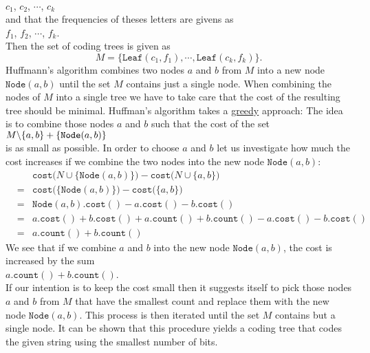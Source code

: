 \\[0.2cm]
\hspace*{1.3cm}
$c_1$, $c_2$, $\cdots$, $c_k$
\\[0.2cm]
and that the frequencies of theses letters are givens as
\\[0.2cm]
\hspace*{1.3cm}
$f_1$, $f_2$, $\cdots$, $f_k$.
\\[0.2cm]
Then the set of coding trees is given as
\begin{equation}
  \label{eq:huffmann1}
 M = \bigl\{  \texttt{Leaf}(c_1, f_1), \cdots, \texttt{Leaf}(c_k, f_k) \bigr\}.   
\end{equation}
Huffmann's algorithm combines two nodes $a$ and $b$ from $M$ into a new node
$\texttt{Node}(a,b)$ until the set $M$ contains just a single node.  When combining the nodes of $M$ into a single
tree we have to take care that the cost of the resulting tree should be minimal.
Huffman's algorithm takes a \href{https://en.wikipedia.org/wiki/Greedy_algorithm}{greedy} approach: 
The idea is to combine those nodes $a$ and $b$ such that the cost of the set
\\[0.2cm]
\hspace*{1.3cm}
$M \symbol{92} \{a,b\} + \{ \texttt{Node}(a,b) \}$
\\[0.2cm]
is as small as possible.
In order to choose $a$ and $b$ let us investigate how much the cost increases if we combine the two nodes
into the new node $\texttt{Node}(a,b)$:
\begin{eqnarray*}
& & \texttt{cost}\bigl(N \cup \{ \texttt{Node}(a,b) \}\bigr) - \texttt{cost}\bigl(N \cup \{ a,b \}\bigr) \\
&=& \texttt{cost}\bigl( \{ \texttt{Node}(a,b) \}\bigr) - \texttt{cost}\bigl(\{ a,b \}\bigr)              \\
&=& \texttt{Node}(a,b).\texttt{cost}() - a.\texttt{cost}() - b.\texttt{cost}()                           \\
&=&   a.\texttt{cost}() + b.\texttt{cost}() + a.\texttt{count}() + b.\texttt{count}() 
    - a.\texttt{cost}() - b.\texttt{cost}()                                                              \\
&=& a.\texttt{count}() + b.\texttt{count}() 
\end{eqnarray*}
We see that if we combine $a$ and $b$ into the new node $\texttt{Node}(a,b)$, the cost is increased by the sum 
\\[0.2cm]
\hspace*{1.3cm}
$a.\texttt{count}() + b.\texttt{count}()$. 
\\[0.2cm]
If our intention is to keep the cost small then it suggests itself to pick those nodes
$a$ and $b$ from $M$ that have the smallest count and replace them with the new node
$\texttt{Node}(a,b)$.  This process is then iterated until the set $M$ contains but a single node.
It can be shown that this procedure yields a coding tree that codes the given string using the smallest number
of bits. 

